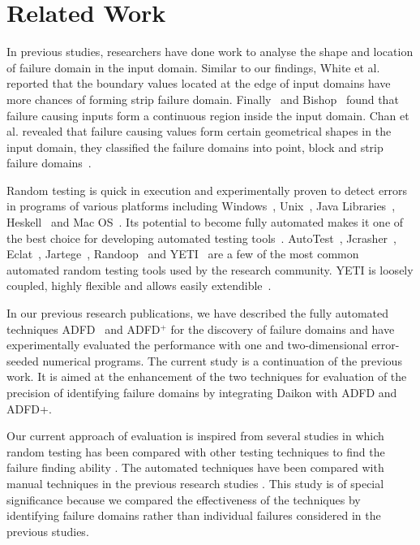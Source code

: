 \section{Related Work}
In previous studies, researchers have done work to analyse the shape and location of failure domain in the input domain. Similar to our findings, White et al.~\cite{white1980domain} reported that the boundary values located at the edge of input domains have more chances of forming strip failure domain. Finally~\cite{finelli1991nasa} and Bishop~\cite{bishop1993variation} found that failure causing inputs form a continuous region inside the input domain. Chan et al. revealed that failure causing values form certain geometrical shapes in the input domain, they classified the failure domains into point, block and strip failure domains~\cite{chan1996proportional}. 

Random testing is quick in execution and experimentally proven to detect errors in programs of various platforms including Windows~\cite{forrester2000empirical}, Unix~\cite{miller1990empirical}, Java Libraries~\cite{pacheco2005eclat}, Heskell~\cite{claessen2011quickcheck} and Mac OS~\cite{miller2006empirical}.  Its potential to become fully automated makes it one of the best choice for developing automated testing tools~\cite{csallner2004jcrasher, pacheco2005eclat}. AutoTest~\cite{ciupa2008predictability}, Jcrasher~\cite{csallner2004jcrasher}, Eclat~\cite{pacheco2005eclat}, Jartege~\cite{oriat2005jartege}, Randoop~\cite{pacheco2007randoop} and YETI~\cite{oriol2012random, ahmad2013adfd, ahmad2014adfd2} are a few of the most common automated random testing tools used by the research community. YETI is loosely coupled, highly flexible and allows easily extendible~\cite{oriol2010testing}. 

In our previous research publications, we have described the fully automated techniques ADFD~\cite{ahmad2013adfd} and ADFD$^+$ \cite{ahmad2014adfd2} for the discovery of failure domains and have experimentally evaluated the performance with one and two-dimensional error-seeded numerical programs. The current study is a continuation of the previous work. It is aimed at the enhancement of the two techniques for evaluation of the precision of identifying failure domains by integrating Daikon with ADFD and ADFD+. 


Our current approach of evaluation is inspired from several studies in which random testing has been compared with other testing techniques to find the failure finding ability \cite{hamlet1990partition, weyuker1991analyzing, gutjahr1999partition}. The automated techniques have been compared with manual techniques in the previous research studies \cite{leitner2007reconciling, ciupa2008finding}. This study is of special significance because we compared the effectiveness of the techniques by identifying failure domains rather than individual failures considered in the previous studies.

